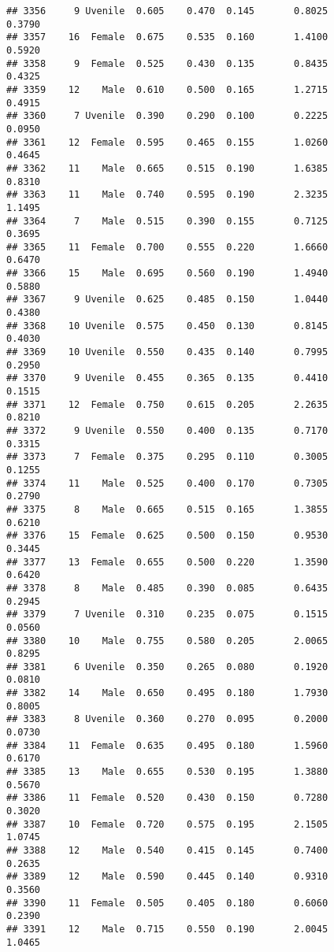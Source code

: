 \documentclass[
]{article}
\begin{document}
\begin{verbatim}
## 3356     9 Uvenile  0.605    0.470  0.145       0.8025         0.3790
## 3357    16  Female  0.675    0.535  0.160       1.4100         0.5920
## 3358     9  Female  0.525    0.430  0.135       0.8435         0.4325
## 3359    12    Male  0.610    0.500  0.165       1.2715         0.4915
## 3360     7 Uvenile  0.390    0.290  0.100       0.2225         0.0950
## 3361    12  Female  0.595    0.465  0.155       1.0260         0.4645
## 3362    11    Male  0.665    0.515  0.190       1.6385         0.8310
## 3363    11    Male  0.740    0.595  0.190       2.3235         1.1495
## 3364     7    Male  0.515    0.390  0.155       0.7125         0.3695
## 3365    11  Female  0.700    0.555  0.220       1.6660         0.6470
## 3366    15    Male  0.695    0.560  0.190       1.4940         0.5880
## 3367     9 Uvenile  0.625    0.485  0.150       1.0440         0.4380
## 3368    10 Uvenile  0.575    0.450  0.130       0.8145         0.4030
## 3369    10 Uvenile  0.550    0.435  0.140       0.7995         0.2950
## 3370     9 Uvenile  0.455    0.365  0.135       0.4410         0.1515
## 3371    12  Female  0.750    0.615  0.205       2.2635         0.8210
## 3372     9 Uvenile  0.550    0.400  0.135       0.7170         0.3315
## 3373     7  Female  0.375    0.295  0.110       0.3005         0.1255
## 3374    11    Male  0.525    0.400  0.170       0.7305         0.2790
## 3375     8    Male  0.665    0.515  0.165       1.3855         0.6210
## 3376    15  Female  0.625    0.500  0.150       0.9530         0.3445
## 3377    13  Female  0.655    0.500  0.220       1.3590         0.6420
## 3378     8    Male  0.485    0.390  0.085       0.6435         0.2945
## 3379     7 Uvenile  0.310    0.235  0.075       0.1515         0.0560
## 3380    10    Male  0.755    0.580  0.205       2.0065         0.8295
## 3381     6 Uvenile  0.350    0.265  0.080       0.1920         0.0810
## 3382    14    Male  0.650    0.495  0.180       1.7930         0.8005
## 3383     8 Uvenile  0.360    0.270  0.095       0.2000         0.0730
## 3384    11  Female  0.635    0.495  0.180       1.5960         0.6170
## 3385    13    Male  0.655    0.530  0.195       1.3880         0.5670
## 3386    11  Female  0.520    0.430  0.150       0.7280         0.3020
## 3387    10  Female  0.720    0.575  0.195       2.1505         1.0745
## 3388    12    Male  0.540    0.415  0.145       0.7400         0.2635
## 3389    12    Male  0.590    0.445  0.140       0.9310         0.3560
## 3390    11  Female  0.505    0.405  0.180       0.6060         0.2390
## 3391    12    Male  0.715    0.550  0.190       2.0045         1.0465

\end{verbatim}
\end{document}
